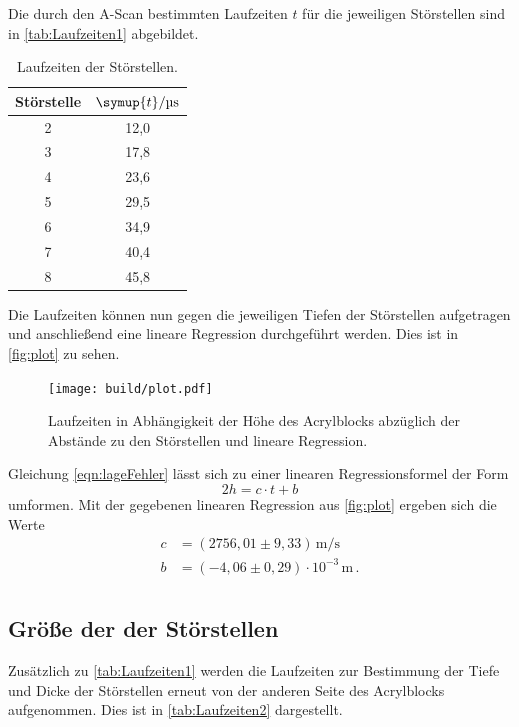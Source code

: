 Die durch den A-Scan bestimmten Laufzeiten $t$ für die jeweiligen Störstellen sind in \autoref{tab:Laufzeiten1} abgebildet.
\begin{table}[H]
  \centering
  \begin{tabular}{c c}
    \toprule
    Störstelle & $\symup{t}/\unit{\micro\second}$ \\
    \midrule
     2 & 12,0 \\
     3 & 17,8 \\
     4 & 23,6 \\
     5 & 29,5 \\
     6 & 34,9 \\
     7 & 40,4 \\
     8 & 45,8 \\
    \bottomrule
  \end{tabular}
  \caption{Laufzeiten der Störstellen.}
  \label{tab:Laufzeiten1}
\end{table}

Die Laufzeiten können nun gegen die jeweiligen Tiefen der Störstellen aufgetragen und anschließend eine
lineare Regression durchgeführt werden. Dies ist in \autoref{fig:plot} zu sehen.
\begin{figure}
  \centering
  \texttt{[image: build/plot.pdf]}
  \caption{Laufzeiten in Abhängigkeit der Höhe des Acrylblocks abzüglich der Abstände zu den Störstellen und
  lineare Regression.}
  \label{fig:plot}
\end{figure}

Gleichung \eqref{eqn:lageFehler} lässt sich zu einer linearen Regressionsformel der Form
\begin{equation*}
  2h = c\cdot t + b
\end{equation*}
umformen. Mit der gegebenen linearen Regression aus \autoref{fig:plot} ergeben sich die Werte
\begin{align*}
  c &= (2756,01 \pm 9,33)\,\unit{\meter\per\second} \\
  b &= (-4,06 \pm 0,29)\cdot 10^{-3}\,\unit{\meter}\,. \\
\end{align*}


\subsection{Größe der der Störstellen}

Zusätzlich zu \autoref{tab:Laufzeiten1} werden die Laufzeiten zur Bestimmung der Tiefe und Dicke der Störstellen erneut von der anderen Seite des Acrylblocks
aufgenommen. Dies ist in \autoref{tab:Laufzeiten2} dargestellt.

